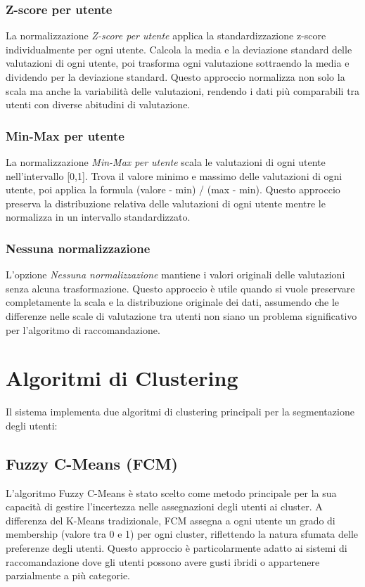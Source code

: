 \subsubsection{Z-score per utente}
La normalizzazione \textit{Z-score per utente} applica la standardizzazione z-score individualmente per ogni utente. Calcola la media e la deviazione standard delle valutazioni di ogni utente, poi trasforma ogni valutazione sottraendo la media e dividendo per la deviazione standard. Questo approccio normalizza non solo la scala ma anche la variabilità delle valutazioni, rendendo i dati più comparabili tra utenti con diverse abitudini di valutazione.

\subsubsection{Min-Max per utente}
La normalizzazione \textit{Min-Max per utente} scala le valutazioni di ogni utente nell'intervallo [0,1]. Trova il valore minimo e massimo delle valutazioni di ogni utente, poi applica la formula (valore - min) / (max - min). Questo approccio preserva la distribuzione relativa delle valutazioni di ogni utente mentre le normalizza in un intervallo standardizzato.

\subsubsection{Nessuna normalizzazione}
L'opzione \textit{Nessuna normalizzazione} mantiene i valori originali delle valutazioni senza alcuna trasformazione. Questo approccio è utile quando si vuole preservare completamente la scala e la distribuzione originale dei dati, assumendo che le differenze nelle scale di valutazione tra utenti non siano un problema significativo per l'algoritmo di raccomandazione.


\section{Algoritmi di Clustering}

Il sistema implementa due algoritmi di clustering principali per la segmentazione degli utenti:

\subsection{Fuzzy C-Means (FCM)}
L'algoritmo Fuzzy C-Means è stato scelto come metodo principale per la sua capacità di gestire l'incertezza nelle assegnazioni degli utenti ai cluster. A differenza del K-Means tradizionale, FCM assegna a ogni utente un grado di membership (valore tra 0 e 1) per ogni cluster, riflettendo la natura sfumata delle preferenze degli utenti. Questo approccio è particolarmente adatto ai sistemi di raccomandazione dove gli utenti possono avere gusti ibridi o appartenere parzialmente a più categorie.

